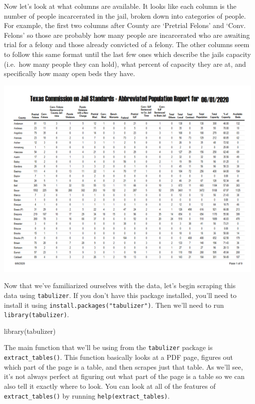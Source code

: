 \documentclass[
]{krantz}
\makeatletter
\newenvironment{Shaded}{\begin{snugshade}}{\end{snugshade}}
\newcommand{\FunctionTok}[1]{\textcolor[rgb]{0,0,0}{#1}}
\newcommand{\NormalTok}[1]{#1}
\newenvironment{kframe}{%
\medskip{}
\setlength{\fboxsep}{.8em}
 \def\at@end@of@kframe{}%
 \ifinner\ifhmode%
  \def\at@end@of@kframe{\end{minipage}}%
  \begin{minipage}{\columnwidth}%
 \fi\fi%
 \def\FrameCommand##1{\hskip\@totalleftmargin \hskip-\fboxsep
 \colorbox{shadecolor}{##1}\hskip-\fboxsep
     \hskip-\linewidth \hskip-\@totalleftmargin \hskip\columnwidth}%
 \MakeFramed {\advance\hsize-\width
   \@totalleftmargin\z@ \linewidth\hsize
   \@setminipage}}%
 {\par\unskip\endMakeFramed%
 \at@end@of@kframe}
\renewenvironment{Shaded}{\begin{kframe}}{\end{kframe}}
\makeatother
\begin{document}
Now let's look at what columns are available. It looks like each column is the number of people incarcerated in the jail, broken down into categories of people. For example, the first two columns after County are `Pretrial Felons' and `Conv. Felons' so those are probably how many people are incarcerated who are awaiting trial for a felony and those already convicted of a felony. The other columns seem to follow this same format until the last few ones which describe the jails capacity (i.e.~how many people they can hold), what percent of capacity they are at, and specifically how many open beds they have.

\includegraphics{images/tabulizer1.PNG}

Now that we've familiarized ourselves with the data, let's begin scraping this data using \texttt{tabulizer}. If you don't have this package installed, you'll need to install it using \texttt{install.packages("tabulizer")}. Then we'll need to run \texttt{library(tabulizer)}.

\begin{Shaded}
\begin{Highlighting}[]
\FunctionTok{library}\NormalTok{(tabulizer)}
\end{Highlighting}
\end{Shaded}

The main function that we'll be using from the \texttt{tabulizer} package is \texttt{extract\_tables()}. This function basically looks at a PDF page, figures out which part of the page is a table, and then scrapes just that table. As we'll see, it's not always perfect at figuring out what part of the page is a table so we can also tell it exactly where to look. You can look at all of the features of \texttt{extract\_tables()} by running \texttt{help(extract\_tables)}.
\end{document}
